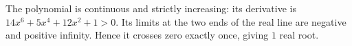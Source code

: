 The polynomial is continuous and strictly increasing: its derivative is $14x^6+5x^4+12x^2+1>0$. Its limits at the two ends of the real line are negative and positive infinity. Hence it crosses zero exactly once, giving $\boxed1$ real root.
